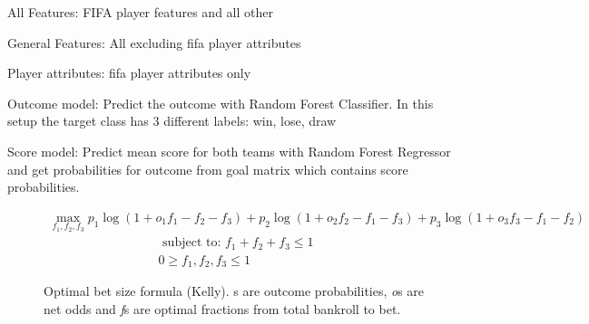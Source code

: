 \begin{description}
    \item All Features: FIFA player features and all other
    \item General Features: All excluding fifa player attributes
    \item Player attributes: fifa player attributes only
    \item Outcome model: Predict the outcome with Random Forest Classifier. In this setup the target class has 3 different labels: win, lose, draw
    \item Score model: Predict mean score for both teams with Random Forest Regressor and get probabilities for outcome from goal matrix which contains score probabilities.
\end{description}

\begin{figure}
    \caption{Optimal bet size formula (Kelly). s are outcome probabilities, \textit{o}s are net odds and \textit{f}s are optimal fractions from total bankroll to bet. }
     \begin{align*}
     \max_{f_1, f_2, f_3} p_1  \log(1 + o_1 f_1 - f_2 - f_3) + p_2 \log(1 + o_2 f_2 - f_1 - f_3) + p_3 \log(1 + o_3 f_3 - f_1 - f_2)
    \end{align*}
    \begin{align*}
        \text { subject to: }  f_1 + f_2 + f_3 \leq 1 \\
         0 \geq f_1, f_2, f_3 \leq 1
    \end{align*}
\end{figure}

